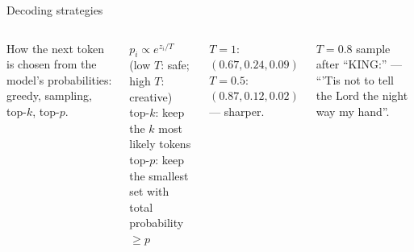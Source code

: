 \documentclass[aspectratio=169,11pt]{beamer}
\begin{document}

\begin{frame}{Decoding strategies}
\begin{columns}[T]
\begin{bdef}[Decoding]
How the next token is chosen from the model's probabilities: greedy, sampling, top-$k$, top-$p$.
\end{bdef}
\begin{bmath}
$p_i\propto e^{z_i/T}$ \; (low $T$: safe; high $T$: creative)\\
top-$k$: keep the $k$ most likely tokens\\
top-$p$: keep the smallest set with total probability $\ge p$
\end{bmath}
\begin{bex}[Logits $(2,1,0)$]
$T=1$: $(0.67, 0.24, 0.09)$\\ $T=0.5$: $(0.87, 0.12, 0.02)$ --- sharper.
\end{bex}
\begin{bres}
$T=0.8$ sample after ``KING:'' --- ``'Tis not to tell the Lord the night way my hand''.
\end{bres}
\end{columns}
\end{frame}
\end{document}
